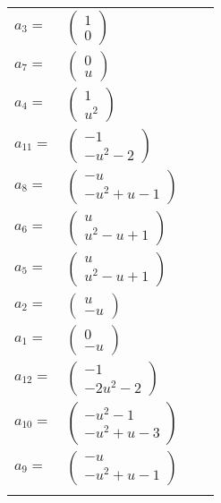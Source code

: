 \documentclass[1p]{elsarticle_modified}
\theoremstyle{definition}
\begin{document}
\begin{tabular}{m{7pt} m{180pt} m{7pt} m{180pt} }
\flushright $a_{3}=$&$\begin{pmatrix}1\\0\end{pmatrix}$ \\
\flushright $a_{7}=$&$\begin{pmatrix}0\\u\end{pmatrix}$ \\
\flushright $a_{4}=$&$\begin{pmatrix}1\\u^2\end{pmatrix}$ \\
\flushright $a_{11}=$&$\begin{pmatrix}-1\\- u^2-2\end{pmatrix}$ \\
\flushright $a_{8}=$&$\begin{pmatrix}- u\\- u^2+u-1\end{pmatrix}$ \\
\flushright $a_{6}=$&$\begin{pmatrix}u\\u^2- u+1\end{pmatrix}$ \\
\flushright $a_{5}=$&$\begin{pmatrix}u\\u^2- u+1\end{pmatrix}$ \\
\flushright $a_{2}=$&$\begin{pmatrix}u\\- u\end{pmatrix}$ \\
\flushright $a_{1}=$&$\begin{pmatrix}0\\- u\end{pmatrix}$ \\
\flushright $a_{12}=$&$\begin{pmatrix}-1\\-2 u^2-2\end{pmatrix}$ \\
\flushright $a_{10}=$&$\begin{pmatrix}- u^2-1\\- u^2+u-3\end{pmatrix}$ \\
\flushright $a_{9}=$&$\begin{pmatrix}- u\\- u^2+u-1\end{pmatrix}$\\&\end{tabular}
\end{document}
